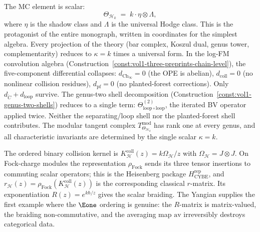 The MC element is scalar:
\begin{equation}\label{eq:heisenberg-mc-element}
\Theta_{\mathcal{H}_k} \;=\; k \cdot \eta \otimes \Lambda,
\end{equation}
where $\eta$ is the shadow class and $\Lambda$ is the universal
Hodge class. This is the protagonist of the entire monograph,
written in coordinates for the simplest algebra. Every projection
of the theory (bar complex, Koszul dual, genus tower,
complementarity) reduces to $\kappa = k$ times a universal form.
In the log-FM convolution algebra
(Construction~\ref{const:vol1-three-preprints-chain-level}),
the five-component differential collapses:
$d_{\mathrm{Ch}_\infty} = 0$ (the OPE is abelian),
$d_{\mathrm{coll}} = 0$ (no nonlinear collision residues),
$d_{\mathrm{pf}} = 0$ (no planted-forest corrections).
Only $d_{\check{C}} + d_{\mathrm{loop}}$ survive.
The genus-two shell decomposition
(Construction~\ref{const:vol1-genus-two-shells}) reduces to a
single term: $\Theta^{(2)}_{\mathrm{loop} \circ \mathrm{loop}}$,
the iterated BV operator applied twice. Neither the
separating/loop shell nor the planted-forest shell contributes.
The modular tangent complex
$T^{\mathrm{mod}}_{\Theta_{\mathcal{H}_k}}$ has rank one at every
genus, and all characteristic invariants are determined by the single
scalar $\kappa = k$.

The ordered binary collision kernel is
$K_{\mathcal H}^{\mathrm{coll}}(z)=k\Omega_{\mathcal H}/z$ with
$\Omega_{\mathcal H}=J\otimes J$.  On Fock-charge modules the
representation $\rho_{\mathrm{Fock}}$ sends its three tensor
insertions to commuting scalar operators; this is the Heisenberg
package $H_{\mathrm{CYBE}}^{\mathrm{rep}}$, and
$r_{\mathcal H}(z)=\rho_{\mathrm{Fock}}
(K_{\mathcal H}^{\mathrm{coll}}(z))$ is the corresponding classical
$r$-matrix.  Its exponentiation
$R(z)=e^{k\hbar/z}$ gives the scalar braiding. The Yangian
supplies the first example where the $\Eone$ ordering is genuine:
the $R$-matrix is matrix-valued, the braiding non-commutative,
and the averaging map $\mathrm{av}$ irreversibly destroys
categorical data.

